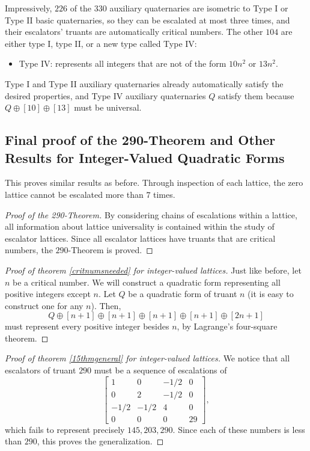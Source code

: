 \documentclass[letterpaper, 12pt]{article}
\begin{document}
Impressively, $226$ of the $330$ auxiliary quaternaries are isometric to Type I or Type II basic quaternaries, so they can be escalated at most three times, and their escalators' truants are automatically critical numbers. The other $104$ are either type I, type II, or a new type called Type IV:
\begin{itemize}
    \item Type IV: represents all integers that are not of the form $10n^2$ or $13n^2$.
\end{itemize}
Type I and Type II auxiliary quaternaries already automatically satisfy the desired properties, and Type IV auxiliary quaternaries $Q$ satisfy them because $Q \oplus [10] \oplus [13]$ must be universal.

\subsection{Final proof of the 290-Theorem and Other Results for Integer-Valued Quadratic Forms}
This proves similar results as before. Through inspection of each lattice, the zero lattice cannot be escalated more than $7$ times.

\begin{proof}[Proof of the 290-Theorem]
    By considering chains of escalations within a lattice, all information about lattice universality is contained within the study of escalator lattices. Since all escalator lattices have truants that are critical numbers, the $290$-Theorem is proved.
\end{proof}

\begin{proof}[Proof of theorem \ref{critnumsneeded} for integer-valued lattices]
    Just like before, let $n$ be a critical number. We will construct a quadratic form representing all positive integers except $n$. Let $Q$ be a quadratic form of truant $n$ (it is easy to construct one for any $n$). Then,
    \[Q \oplus [n + 1] \oplus [n + 1] \oplus [n + 1] \oplus [n + 1] \oplus [2n + 1]\]
    must represent every positive integer besides $n$, by Lagrange's four-square theorem.
\end{proof}

\begin{proof}[Proof of theorem \ref{15thmgeneral} for integer-valued lattices]
    We notice that all escalators of truant $290$ must be a sequence of escalations of
    \[\begin{bmatrix}
    1 & 0 & -1/2 & 0 \\
    0 & 2 & -1/2 & 0 \\
    -1/2 & -1/2 & 4 & 0 \\
    0 & 0 & 0 & 29
    \end{bmatrix},\]
    which fails to represent precisely $145, 203, 290$. Since each of these numbers is less than $290$, this proves the generalization.
\end{proof}
\end{document}

